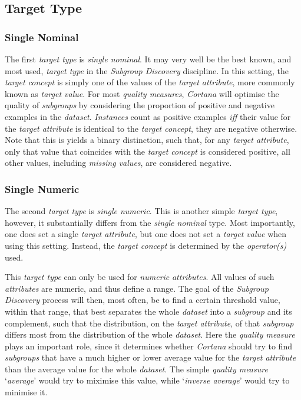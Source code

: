 \documentclass{article}
\begin{document}
\subsection{Target Type}
\label{preliminaries:target-type}

\subsubsection{Single Nominal}
The first \emph{target type} is \emph{single nominal}.
It may very well be the best known, and most used, \emph{target type} in the \emph{Subgroup Discovery} discipline.
In this setting, the \emph{target concept} is simply one of the values of the \emph{target attribute}, more commonly known as \emph{target value}.
For most \emph{quality measures}, \emph{Cortana} will optimise the quality of \emph{subgroups} by considering the proportion of positive and negative examples in the \emph{dataset}.
\emph{Instances} count as positive examples \emph{iff} their value for the \emph{target attribute} is identical to the \emph{target concept}, they are negative otherwise.
Note that this is yields a binary distinction, such that, for any \emph{target attribute}, only that value that coincides with the \emph{target concept} is considered positive, all other values, including \emph{missing values}, are considered negative.

\subsubsection{Single Numeric}
The second \emph{target type} is \emph{single numeric}.
This is another simple \emph{target type}, however, it substantially differs from the \emph{single nominal} type.
Most importantly, one does set a single \emph{target attribute}, but one does not set a \emph{target value} when using this setting.
Instead, the \emph{target concept} is determined by the \emph{operator(s)} used.

This \emph{target type} can only be used for \emph{numeric} \emph{attributes}.
All values of such \emph{attributes} are numeric, and thus define a range.
The goal of the \emph{Subgroup Discovery} process will then, most often, be to find a certain threshold value, within that range, that best separates the whole \emph{dataset} into a \emph{subgroup} and its complement, such that the distribution, on the \emph{target attribute}, of that \emph{subgroup} differs most from the distribution of the whole \emph{dataset}.
Here the \emph{quality measure} plays an important role, since it determines whether \emph{Cortana} should try to find \emph{subgroups} that have a much higher or lower average value for the \emph{target attribute} than the average value for the whole \emph{dataset}.
The simple \emph{quality measure} `\emph{average}'  would try to miximise this value, while `\emph{inverse average}' would try to minimise it.
\end{document}
